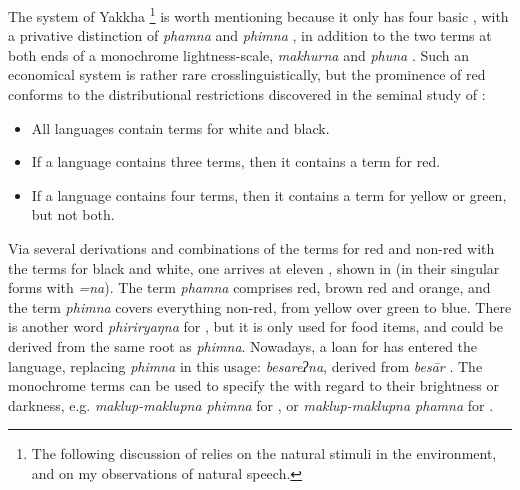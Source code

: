 The system of Yakkha \footnote{The following discussion of  relies on the natural stimuli in the environment, and on my observations of natural speech.} is worth mentioning because it only has four basic , with a privative distinction of \emph{phamna}  and \emph{phimna} , in addition to the two terms at both ends of a monochrome lightness-scale, \emph{makhurna}  and \emph{phuna} . Such an economical system is rather rare crosslinguistically, but the prominence of red conforms to the distributional restrictions discovered in the seminal study of \citet[2--3]{Berlinetal1969Basic}: 

\begin{itemize}
\item All languages contain terms for white and black.
\item If a language contains three terms, then it contains a term for red. 
\item If a language contains four terms, then it contains a term for yellow or green, but not both.
\end{itemize}

Via several derivations and combinations of the terms for red and non-red with the terms for black and white, one arrives at eleven , shown in  (in their singular forms with \emph{=na}). The term \emph{phamna} comprises  red, brown red and orange, and the term \emph{phimna} covers everything non-red, from yellow over green to blue. There is another word \emph{phiriryaŋna} for , but it is only used for food items, and could be derived from the same root as \emph{phimna}. Nowadays, a  loan for  has entered the language, replacing \emph{phimna} in this usage: \emph{besareʔna}, derived from  \emph{besār} .   The monochrome terms can be used to specify the  with regard to their brightness or darkness, e.g. \emph{maklup-maklupna phimna} for , or \emph{maklup-maklupna phamna} for . 




